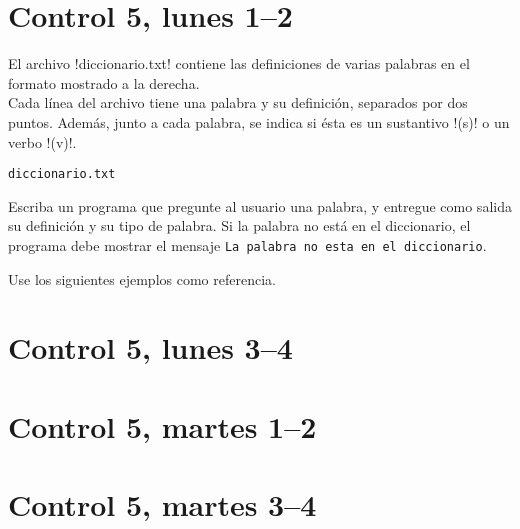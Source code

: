 \documentclass[12pt,spanish,a5paper,landscape]{article}
\begin{document}
  \pagestyle{empty}
  \thispagestyle{empty}

  \part*{Control 5, lunes 1--2}
  \newpage

  \begin{minipage}[t]{0.45\textwidth}
    El archivo \li!diccionario.txt!
    contiene las definiciones de varias palabras
    en el formato mostrado a la derecha.
    \\[2ex]
    Cada línea del archivo tiene una palabra y su definición,
    separados por dos puntos.
    Además, junto a cada palabra,
    se indica si ésta es un sustantivo \li!(s)!
    o un verbo \li!(v)!.
  \end{minipage}
  \hfill
  \begin{minipage}[t]{0.45\textwidth}
    \hfil\verb!diccionario.txt!\hfil
    \small
    
  \end{minipage}

  Escriba un programa que pregunte al usuario una palabra,
  y entregue como salida su definición y su tipo de palabra.
  Si la palabra no está en el diccionario,
  el programa debe mostrar el mensaje
  \texttt{La palabra no esta en el diccionario}.

  Use los siguientes ejemplos como referencia.

  \begin{minipage}[t]{0.6\textwidth}
    
  \end{minipage}

  \begin{minipage}[t]{0.6\textwidth}
    
  \end{minipage}

  \newpage

  \part*{Control 5, lunes 3--4}
  \newpage

  \newpage

  \part*{Control 5, martes 1--2}
  \newpage

  \newpage

  \part*{Control 5, martes 3--4}
  \newpage
\end{document}
